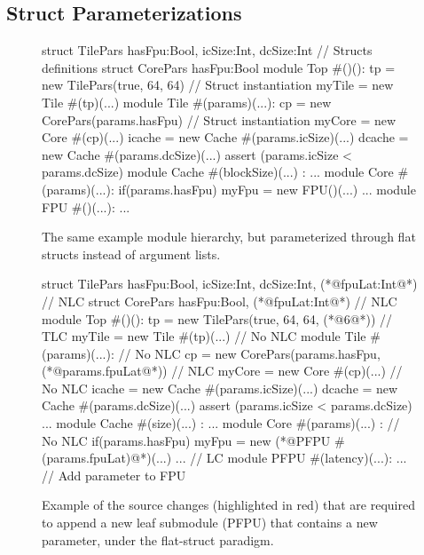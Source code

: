 \subsection{Struct Parameterizations}

\begin{figure}
\centering
\begin{phdl}
struct TilePars {hasFpu:Bool, icSize:Int, dcSize:Int} // Structs definitions
struct CorePars {hasFpu:Bool}
module Top #()():
  tp = new TilePars(true, 64, 64)                     // Struct instantiation
  myTile = new Tile #(tp)(...)
module Tile #(params)(...):
  cp = new CorePars(params.hasFpu)                    // Struct instantiation
  myCore = new Core  #(cp)(...)
  icache = new Cache #(params.icSize)(...)
  dcache = new Cache #(params.dcSize)(...)
  assert (params.icSize < params.dcSize)
module Cache #(blockSize)(...) : ...
module Core #(params)(...):
  if(params.hasFpu) myFpu = new FPU()(...) ...
module FPU #()(...): ...
\end{phdl} 
\caption{The same example module hierarchy, but parameterized through flat structs instead of argument lists.}
\label{fig:flatstruct}
\end{figure}

\begin{figure}
\centering
\begin{phdl}
struct TilePars {hasFpu:Bool, icSize:Int, dcSize:Int, (*@\textcolor[rgb]{1,0,0}{fpuLat:Int}@*)} // NLC
struct CorePars {hasFpu:Bool, (*@\textcolor[rgb]{1,0,0}{fpuLat:Int}@*)}                         // NLC
module Top #()():
  tp = new TilePars(true, 64, 64, (*@\textcolor[rgb]{1,0,0}{6}@*))                              // TLC
  myTile = new Tile #(tp)(...)                                    // No NLC
module Tile #(params)(...):                                       // No NLC
  cp = new CorePars(params.hasFpu, (*@\textcolor[rgb]{1,0,0}{params.fpuLat}@*))                 // NLC
  myCore = new Core  #(cp)(...)                                   // No NLC
  icache = new Cache #(params.icSize)(...)
  dcache = new Cache #(params.dcSize)(...)
  assert (params.icSize < params.dcSize) ...
module Cache #(size)(...) : ...
module Core #(params)(...) :                                     // No NLC
  if(params.hasFpu) myFpu = new (*@\textcolor[rgb]{1,0,0}{PFPU \#(params.fpuLat)}@*)(...) ...   // LC
module PFPU #(latency)(...): ...     // Add parameter to FPU 
\end{phdl} 
\caption{Example of the source changes (highlighted in red) that are required to append a new leaf submodule (PFPU) that contains a new parameter,
under the flat-struct paradigm.}
\label{fig:flatstruct-delta}
\end{figure}

